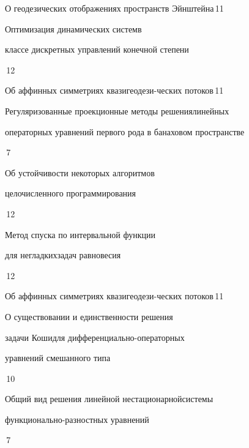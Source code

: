 

{О геодезических отображениях пространств Эйнштейна}{\No\,11}




{Оптимизация динамических систем\newline в


классе дискретных управлений конечной степени}{\No\,12}




{Об аффинных симметриях квазигеодези-\newline ческих потоков}{\No\,11}




{Регуляризованные проекционные методы решения\newline линейных


операторных уравнений первого рода в банаховом пространстве}{\No\,7}




{Об устойчивости некоторых алгоритмов\newline 


целочисленного программирования}{\No\,12}




{Метод спуска по интервальной функции


для негладких\newline задач равновесия}{\No\,12}




{Об аффинных симметриях квазигеодези-\newline ческих потоков}{\No\,11}




{О существовании и единственности решения  


задачи Коши\newline для дифференциально-операторных 


уравнений смешанного типа}{\No\,10}




{Общий вид решения линейной нестационарной\newline системы


функционально-разностных уравнений}{\No\,7}




